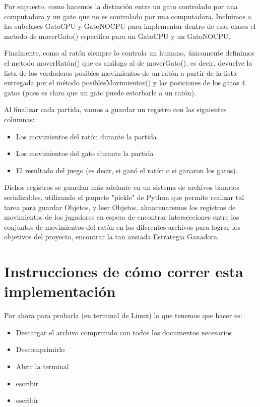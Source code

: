 \documentclass[12pt, Tahoma]{article}
\begin{document}
	
	Por supuesto, como hacemos la distinción entre un gato controlado por una computadora y un gato que no es controlado por una computadora. Incluimos a las subclases GatoCPU y GatoNOCPU para implementar dentro de esas clases el metodo de moverGato() especifico para un GatoCPU y un GatoNOCPU.
	
	
	Finalmente, como al ratón siempre lo controla un humano, únicamente definimos el metodo moverRatón() que es análogo al de moverGato(), es decir, devuelve la lista de los verdaderos posibles movimientos de un ratón a partir de la lista entregada por el método posiblesMovimientos() y las posiciones de los gatos 4 gatos (pues es claro que un gato puede estorbarle a un ratón).
	
	Al finalizar cada partida, vamos a guardar un registro con las siguientes columnas:
	\begin{itemize}
		\item Los movimientos del ratón durante la partida
		\item Los movimientos del gato durante la partida
		\item El resultado del juego (es decir, si ganó el ratón o si ganaron los gatos).
	\end{itemize}
	
	
	Dichos registros se guardan más adelante en un sistema de archivos binarios serializables, utilizando el paquete "pickle" de Python que permite realizar tal tarea para guardar Objetos, y leer Objetos, almacenaremos los registros de movimientos de los jugadores en espera de encontrar intersecciones entre los conjuntos de movimientos del ratón en los diferentes archivos para lograr los objetivos del proyecto, encontrar la tan ansiada Estrategia Ganadora. 
	
	
	\section*{Instrucciones de cómo correr esta implementación}
	
	
	Por ahora para probarla (en terminal de Linux) lo que tenemos que hacer es:
	\begin{itemize}
		\item Descargar el archivo comprimido con todos los documentos necesarios
		\item Descomprimirlo
		\item Abrir la terminal 
		\item escribir 
		\item escribir 
	\end{itemize}
	
\end{document}
